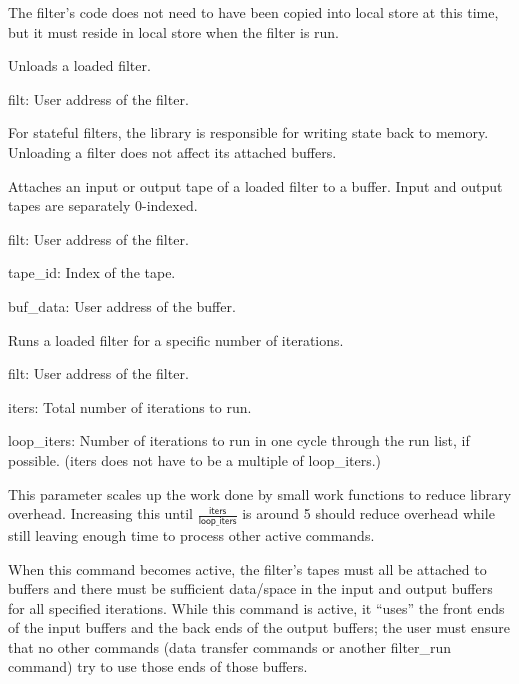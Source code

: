 \begin{description}
The filter's code does not need to have been copied into local store at this time, but it must reside in local store when the filter is run.

\item[\textsf{filter\_unload}] Unloads a loaded filter.
\begin{description}
\item \textsf{filt}: User address of the filter.
\end{description}

For stateful filters, the library is responsible for writing state back to memory. Unloading a filter does not affect its attached buffers.

\item[\textsf{filter\_attach\_input}, \textsf{filter\_attach\_output}] Attaches an input or output tape of a loaded filter to a buffer. Input and output tapes are separately 0-indexed.
\begin{description}
\item \textsf{filt}: User address of the filter.
\item \textsf{tape\_id}: Index of the tape.
\item \textsf{buf\_data}: User address of the buffer.
\end{description}

\item[\textsf{filter\_run}] Runs a loaded filter for a specific number of iterations.
\begin{description}
\item \textsf{filt}: User address of the filter.
\item \textsf{iters}: Total number of iterations to run.
\item \textsf{loop\_iters}: Number of iterations to run in one cycle through the run list, if possible. (\textsf{iters} does not have to be a multiple of \textsf{loop\_iters}.)

This parameter scales up the work done by small work functions to reduce library overhead. Increasing this until $\frac{\mathsf{iters}}{\mathsf{loop\_iters}}$ is around 5 should reduce overhead while still leaving enough time to process other active commands.
\end{description}

When this command becomes active, the filter's tapes must all be attached to buffers and there must be sufficient data/space in the input and output buffers for all specified iterations. While this command is active, it ``uses'' the front ends of the input buffers and the back ends of the output buffers; the user must ensure that no other commands (data transfer commands or another \textsf{filter\_run} command) try to use those ends of those buffers.

\end{description}

